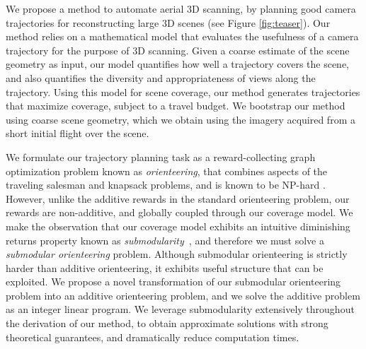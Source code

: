 We propose a method to automate aerial 3D scanning, by planning good camera trajectories for reconstructing large 3D scenes (see Figure \ref{fig:teaser}).
Our method relies on a mathematical model that evaluates the usefulness of a camera trajectory for the purpose of 3D scanning.
Given a coarse estimate of the scene geometry as input, our model quantifies how well a trajectory covers the scene, and also quantifies the diversity and appropriateness of views along the trajectory.
Using this model for scene coverage, our method generates trajectories that maximize coverage, subject to a travel budget.
We bootstrap our method using coarse scene geometry, which we obtain using the imagery acquired from a short initial flight over the scene. 



We formulate our trajectory planning task as a reward-collecting graph optimization problem known as \textit{orienteering}, that combines aspects of the traveling salesman and knapsack problems, and is known to be NP-hard \cite{gunawan:2016,vansteenwegena:2011}.
However, unlike the additive rewards in the standard orienteering problem, our rewards are non-additive, and globally coupled through our coverage model.
We make the observation that our coverage model exhibits an intuitive diminishing returns property known as \textit{submodularity}~\cite{krause:2014}, and therefore we must solve a \textit{submodular orienteering} problem.
Although submodular orienteering is strictly harder than additive orienteering, it exhibits useful structure that can be exploited.
We propose a novel transformation of our submodular orienteering problem into an additive orienteering problem, and we solve the additive problem as an integer linear program. We leverage submodularity extensively throughout the derivation of our method, to obtain approximate solutions with strong theoretical guarantees, and dramatically reduce computation times.

